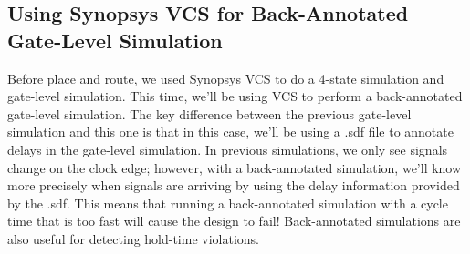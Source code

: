 \documentclass[a4paper,12pt,twoside]{article}
\begin{document}
\subsection{Using Synopsys VCS for Back-Annotated Gate-Level Simulation}
Before place and route, we used Synopsys VCS to do a 4-state simulation and gate-level simulation. This time, we’ll be using VCS to perform a back-annotated gate-level simulation. The key difference between the previous gate-level simulation and this one is that in this case, we’ll be using a .sdf file to annotate delays in the gate-level simulation. In previous simulations, we only see signals change on the clock edge; however, with a back-annotated simulation, we’ll know more precisely when signals are arriving by using the delay information provided by the .sdf. This means that running a back-annotated simulation with a cycle time that is too fast will cause the design to fail! Back-annotated simulations are also useful for detecting hold-time violations.
\end{document}
